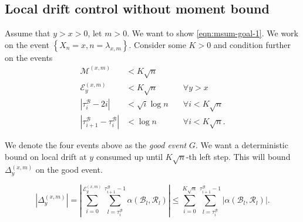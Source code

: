 
\subsection{Local drift control without moment bound}

Assume that $y > x >  0$, let $m > 0$. We want to show \eqref{eqn:msum-goal-1}.
We work on the event $\left\{ X_n = x, n = \lambda_{x, m} \right\} $. Consider some $K>0$ and condition further on the events
\begin{align}
	\mathcal{M}^{(x,m)} &< K \sqrt{ n} \label{eqn:good-event-1}\\
	\mathcal{E}_y^{(x,m)} &< K \sqrt{n} \quad &\forall y>x\\
	\left| \tau_i^{\mathcal{B}} - 2 i \right| &< \sqrt{ i} \log n \quad &\forall i < K \sqrt{n} \\
	\left| \tau_{i+1}^{\mathcal{B}} - \tau_i^{\mathcal{B}} \right| &< \log n \quad &\forall i < K \sqrt{n} \label{eqn:good-event-2}
.\end{align} 

We denote the four events above as the \textit{good event} $G$.
We want a deterministic bound on local drift at $y$ consumed up until $K\sqrt{n}$-th left step. This will bound $\Delta_y^{(x,m)}$ on the good event.

\begin{equation*}
	\left| \Delta_y^{(x,m)} \right| 
	= 
	\left| 	\sum_{i = 0}^{\mathcal{E}_y^{(x,m)}} 
	\sum_{l = \tau_i^{\mathcal{B}}} ^{\tau_{i+1}^{\mathcal{B}}  -1}
	\alpha(\mathcal{B}_l, \mathcal{R}_l)
	\right| 
	\le 
	\sum_{i = 0}^{K \sqrt{n} } 
	\sum_{l = \tau_i^{\mathcal{B}}} ^{\tau_{i+1}^{\mathcal{B}}  -1}
	\left|
	\alpha(\mathcal{B}_l, \mathcal{R}_l)
	\right| 
	.
\end{equation*}

